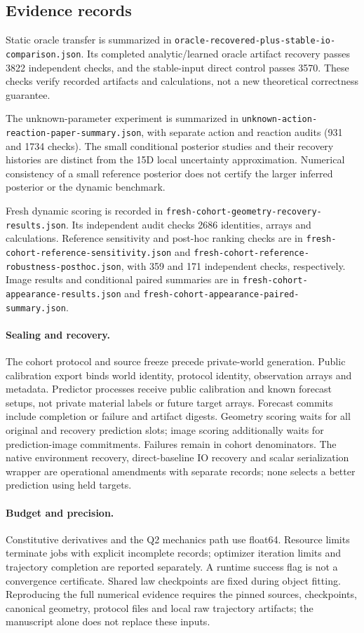 \documentclass[10pt,twocolumn,letterpaper]{article}
\newcommand{\file}[1]{{\small\nolinkurl{#1}}}
\begin{document}
\subsection{Evidence records}
Static oracle transfer is summarized in \file{oracle-recovered-plus-stable-io-comparison.json}. Its completed analytic/learned oracle artifact recovery passes 3822 independent checks, and the stable-input direct control passes 3570. These checks verify recorded artifacts and calculations, not a new theoretical correctness guarantee.

The unknown-parameter experiment is summarized in \file{unknown-action-reaction-paper-summary.json}, with separate action and reaction audits (931 and 1734 checks). The small conditional posterior studies and their recovery histories are distinct from the 15D local uncertainty approximation. Numerical consistency of a small reference posterior does not certify the larger inferred posterior or the dynamic benchmark.

Fresh dynamic scoring is recorded in \file{fresh-cohort-geometry-recovery-results.json}. Its independent audit checks 2686 identities, arrays and calculations. Reference sensitivity and post-hoc ranking checks are in \file{fresh-cohort-reference-sensitivity.json} and \file{fresh-cohort-reference-robustness-posthoc.json}, with 359 and 171 independent checks, respectively. Image results and conditional paired summaries are in \file{fresh-cohort-appearance-results.json} and \file{fresh-cohort-appearance-paired-summary.json}.

\paragraph{Sealing and recovery.}
The cohort protocol and source freeze precede private-world generation. Public calibration export binds world identity, protocol identity, observation arrays and metadata. Predictor processes receive public calibration and known forecast setups, not private material labels or future target arrays. Forecast commits include completion or failure and artifact digests. Geometry scoring waits for all original and recovery prediction slots; image scoring additionally waits for prediction-image commitments. Failures remain in cohort denominators. The native environment recovery, direct-baseline IO recovery and scalar serialization wrapper are operational amendments with separate records; none selects a better prediction using held targets.

\paragraph{Budget and precision.}
Constitutive derivatives and the Q2 mechanics path use float64. Resource limits terminate jobs with explicit incomplete records; optimizer iteration limits and trajectory completion are reported separately. A runtime success flag is not a convergence certificate. Shared law checkpoints are fixed during object fitting. Reproducing the full numerical evidence requires the pinned sources, checkpoints, canonical geometry, protocol files and local raw trajectory artifacts; the manuscript alone does not replace these inputs.
\end{document}
